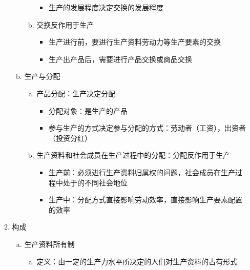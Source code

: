\documentclass[12pt]{book}
\begin{document}
\begin{enumerate}[1.]
\begin{enumerate}[(1)]
\begin{enumerate}[a.]
\begin{enumerate}[(a)]
\begin{itemize}
                                    \item 生产的发展程度决定交换的发展程度
                                  \end{itemize}
                            \item 交换反作用于生产
                                  \begin{itemize}
                                    \item 生产进行前，要进行生产资料劳动力等生产要素的交换
                                    \item 生产出产品后，需要进行产品交换或商品交换
                                  \end{itemize}
                          \end{enumerate}
                    \item 生产与分配
                          \begin{enumerate}[(a)]
                            \item 产品分配：生产决定分配
                                  \begin{itemize}
                                    \item 分配对象：是生产的产品
                                    \item 参与生产的方式决定参与分配的方式：劳动者（工资），出资者（投资分红）
                                  \end{itemize}
                            \item 生产资料和社会成员在生产过程中的分配：分配反作用于生产
                                  \begin{itemize}
                                    \item 生产前：必须进行生产资料归属权的问题，社会成员在生产过程中处于的不同社会地位
                                    \item 生产中：分配方式直接影响劳动效率，直接影响生产要素配置的效率
                                  \end{itemize}
                          \end{enumerate}
                  \end{enumerate}
            \item 构成
                  \begin{enumerate}[a.]
                    \item 生产资料所有制
                          \begin{enumerate}[(a)]
                            \item 定义：由一定的生产力水平所决定的人们对生产资料的占有形式

\end{enumerate}
\end{enumerate}
\end{enumerate}
\end{enumerate}
\end{document}
